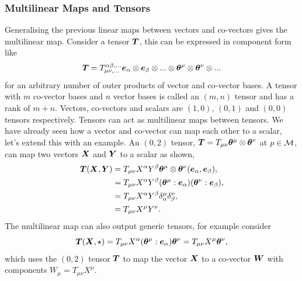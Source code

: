 \subsubsection{Multilinear Maps and Tensors}
Generalising the previous linear maps between vectors and co-vectors gives the multilinear map. Consider a tensor $\boldsymbol{T}$, this can be expressed in component form like
\begin{equation}\boldsymbol{T} = T^{\alpha\beta, ...}_{\mu\nu,...} \boldsymbol{e}_\alpha\otimes\boldsymbol{e}_\beta \otimes... \otimes\boldsymbol{\theta}^\mu \otimes\boldsymbol{\theta}^\nu\otimes...
\end{equation}
for an arbitrary number of outer products of vector and co-vector bases. A tensor with $m$ co-vector bases and $n$ vector bases is called an $(m,n)$ tensor and has a rank of $m+n$. Vectors, co-vectors and scalars are $(1,0)$, $(0,1)$ and $(0,0)$ tensors respectively.  Tensors can act as multilinear maps between tensors. We have already seen how a vector and co-vector can map each other to a scalar, let's extend this with an example. An $(0,2)$ tensor, $\boldsymbol{T}=T_{\mu\nu}\boldsymbol{\theta}^\mu\otimes\boldsymbol{\theta}^\nu$ at $p\in\mathcal{M}$, can map two vectors $\boldsymbol{X}$ and $\boldsymbol{Y}$ to a scalar as shown,
\begin{align}
\boldsymbol{T}(\boldsymbol{X},\boldsymbol{Y})
&=T_{\mu\nu}X^\alpha Y^\beta \boldsymbol{\theta}^\mu \otimes \boldsymbol{\theta}^\nu (\boldsymbol{e}_\alpha,\boldsymbol{e}_\beta),\\
&= T_{\mu\nu}X^\alpha Y^\beta (\boldsymbol{\theta}^\mu:\boldsymbol{e}_\alpha)( \boldsymbol{\theta}^\nu:\boldsymbol{e}_\beta) ,\\
&= T_{\mu\nu}X^\alpha Y^\beta \delta^\mu_\alpha  \delta^\nu_\beta ,\\
&= T_{\mu\nu}X^\mu Y^\nu.
\end{align}
The multilinear map can also output generic tensors, for example consider
\begin{equation}
\boldsymbol{T}(\boldsymbol{X},\star) = T_{\mu\nu} X^\alpha (\boldsymbol{\theta}^\mu:\boldsymbol{e}_\alpha)\boldsymbol{\theta}^\nu = T_{\mu\nu}X^\mu \boldsymbol{\theta}^\nu,
\end{equation}
which uses the $(0,2)$ tensor $\boldsymbol{T}$ to map the vector $\boldsymbol{X}$ to a co-vector $\boldsymbol{W}$ with components $W_\mu = T_{\mu\nu}X^\mu$.

